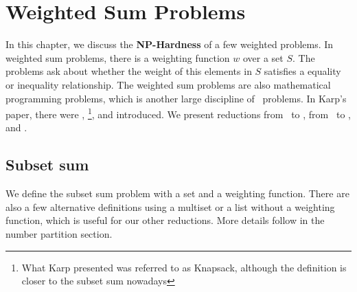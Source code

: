 \chapter{Weighted Sum Problems}\label{chapter:weighted}
In this chapter, we discuss the \textbf{NP-Hardness} of a few weighted problems. In weighted sum problems, 
there is a weighting function $w$ over a set $S$. The problems ask about whether the weight of this elements 
in $S$ satisfies a equality or inequality relationship. The weighted sum problems are also mathematical programming 
problems, which is another large discipline of \NPH\ problems. In Karp's paper, there were \XC, \SBS \footnote{What Karp presented was referred to as Knapsack, although
the definition is closer to the subset sum nowadays}, and \KN introduced. 
We present reductions from \XC\ to \SBS, from \SBS\ to \Part, \KN and \IP. 

\section{Subset sum}
We define the subset sum problem with a set and a weighting function. There are also a few alternative definitions using a multiset or a list without 
a weighting function, which is useful for our other reductions. More details follow in the number partition section. 

